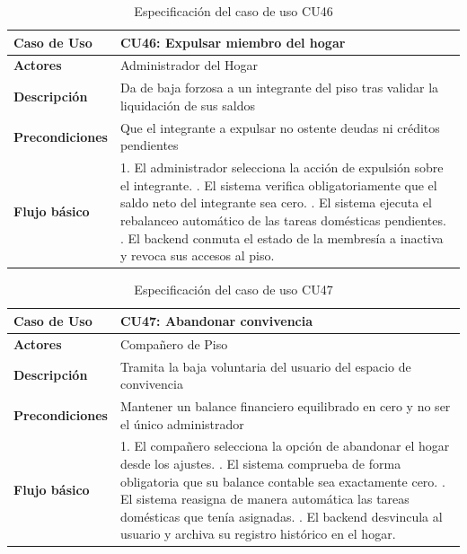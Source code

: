 \begin{table}[H]
\centering
\begin{tabular}{|p{3.2cm}|p{11.3cm}|}
\hline
\textbf{Caso de Uso} & \textbf{CU46: Expulsar miembro del hogar} \\ \hline
\textbf{Actores} & Administrador del Hogar \\ \hline
\textbf{Descripción} & Da de baja forzosa a un integrante del piso tras validar la liquidación de sus saldos \\ \hline
\textbf{Precondiciones} & Que el integrante a expulsar no ostente deudas ni créditos pendientes \\ \hline
\textbf{Flujo básico} & 
1. El administrador selecciona la acción de expulsión sobre el integrante. \newline
2. El sistema verifica obligatoriamente que el saldo neto del integrante sea cero. \newline
3. El sistema ejecuta el rebalanceo automático de las tareas domésticas pendientes. \newline
4. El backend conmuta el estado de la membresía a inactiva y revoca sus accesos al piso. \\ \hline
\end{tabular}
\caption{Especificación del caso de uso CU46}
\label{tab:cu46}
\end{table}

\begin{table}[H]
\centering
\begin{tabular}{|p{3.2cm}|p{11.3cm}|}
\hline
\textbf{Caso de Uso} & \textbf{CU47: Abandonar convivencia} \\ \hline
\textbf{Actores} & Compañero de Piso \\ \hline
\textbf{Descripción} & Tramita la baja voluntaria del usuario del espacio de convivencia \\ \hline
\textbf{Precondiciones} & Mantener un balance financiero equilibrado en cero y no ser el único administrador \\ \hline
\textbf{Flujo básico} & 
1. El compañero selecciona la opción de abandonar el hogar desde los ajustes. \newline
2. El sistema comprueba de forma obligatoria que su balance contable sea exactamente cero. \newline
3. El sistema reasigna de manera automática las tareas domésticas que tenía asignadas. \newline
4. El backend desvincula al usuario y archiva su registro histórico en el hogar. \\ \hline
\end{tabular}
\caption{Especificación del caso de uso CU47}
\label{tab:cu47}
\end{table}

